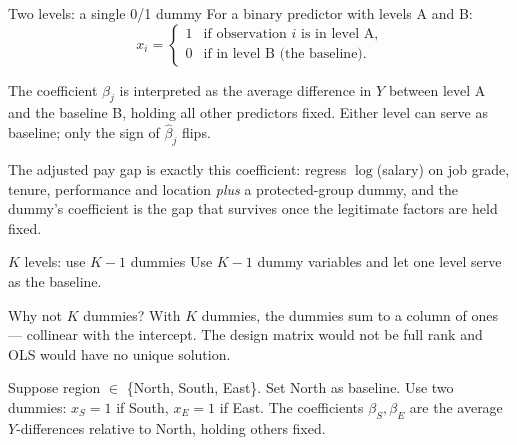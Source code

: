 \documentclass[aspectratio=169,11pt]{beamer}
\begin{document}
\begin{frame}{Two levels: a single 0/1 dummy}
  For a binary predictor with levels A and B:
  \[
    x_i = \begin{cases}
            1 & \text{if observation $i$ is in level A,} \\
            0 & \text{if in level B (the baseline).}
          \end{cases}
  \]
  \begin{readme}
    The coefficient $\beta_j$ is interpreted as the average difference
    in $Y$ between level A and the baseline B, holding all other
    predictors fixed. Either level can serve as baseline; only the
    sign of $\hat\beta_j$ flips.
  \end{readme}
  The adjusted pay gap is exactly this coefficient: regress $\log$(salary) on
  job grade, tenure, performance and location \emph{plus} a protected-group
  dummy, and the dummy's coefficient is the gap that survives once the
  legitimate factors are held fixed.
\end{frame}

\begin{frame}{$K$ levels: use $K-1$ dummies}
  Use $K - 1$ dummy variables and let one level serve as the baseline.
  \begin{alertblock}{Why not $K$ dummies?}
    With $K$ dummies, the dummies sum to a column of ones --- collinear
    with the intercept. The design matrix would not be full rank and
    OLS would have no unique solution.
  \end{alertblock}
  \begin{numexample}
    Suppose region $\in$ \{North, South, East\}. Set North as baseline.
    Use two dummies: $x_S = 1$ if South, $x_E = 1$ if East. The
    coefficients $\beta_S, \beta_E$ are the average $Y$-differences
    relative to North, holding others fixed.
  \end{numexample}
\end{frame}
\end{document}
